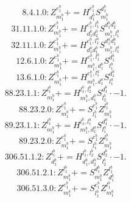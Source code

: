\documentclass[letterpaper,10pt,fleqn,leqno,onecolumn]{article}
\begin{document}
\begin{equation} \;\;\;\;\;\;  8.4.1.0: Z^{e_{1}^{b}}_{m_{1}^{b}}+=H^{e_{1}^{b}}_{d_{1}^{b}}S^{d_{1}^{b}}_{m_{1}^{b}} \end{equation}
\begin{equation} \;\;\;\;\;\;  31.11.1.0: Z^{e_{1}^{b}}_{m_{1}^{b}}+=H^{e_{1}^{b},l_{1}^{b}}_{d_{1}^{b}d_{2}^{b}}S^{d_{1}^{b}d_{2}^{b}}_{m_{1}^{b},l_{1}^{b}} \end{equation}
\begin{equation} \;\;\;\;\;\;  32.11.1.0: Z^{e_{1}^{b}}_{m_{1}^{b}}+=H^{e_{1}^{b},l_{1}^{a}}_{d_{1}^{a}d_{1}^{b}}S^{d_{1}^{a}d_{1}^{b}}_{m_{1}^{b},l_{1}^{a}} \end{equation}
\begin{equation} \;\;\;\;\;\;  12.6.1.0: Z^{e_{1}^{b}}_{m_{1}^{b}}+=H^{e_{1}^{b},l_{1}^{b}}_{m_{1}^{b},d_{1}^{b}}S^{d_{1}^{b}}_{l_{1}^{b}} \end{equation}
\begin{equation} \;\;\;\;\;\;  13.6.1.0: Z^{e_{1}^{b}}_{m_{1}^{b}}+=H^{e_{1}^{b},l_{1}^{a}}_{m_{1}^{b},d_{1}^{a}}S^{d_{1}^{a}}_{l_{1}^{a}} \end{equation}
\begin{equation} \;\;\;\;\;\;  88.23.1.1: Z^{l_{1}^{b}}_{m_{1}^{b}}+=H^{l_{1}^{b},l_{2}^{b}}_{m_{1}^{b},d_{1}^{b}}S^{d_{1}^{b}}_{l_{2}^{b}}\cdot -1. \end{equation}
\begin{equation} \;\;\;\;\;\;  88.23.2.0: Z^{e_{1}^{b}}_{m_{1}^{b}}+=S^{e_{1}^{b}}_{l_{1}^{b}}Z^{l_{1}^{b}}_{m_{1}^{b}} \end{equation}
\begin{equation} \;\;\;\;\;\;  89.23.1.1: Z^{l_{1}^{b}}_{m_{1}^{b}}+=H^{l_{1}^{b},l_{1}^{a}}_{m_{1}^{b},d_{1}^{a}}S^{d_{1}^{a}}_{l_{1}^{a}}\cdot -1. \end{equation}
\begin{equation} \;\;\;\;\;\;  89.23.2.0: Z^{e_{1}^{b}}_{m_{1}^{b}}+=S^{e_{1}^{b}}_{l_{1}^{b}}Z^{l_{1}^{b}}_{m_{1}^{b}} \end{equation}
\begin{equation} \;\;\;\;\;\;  306.51.1.2: Z^{l_{1}^{b}}_{d_{1}^{b}}+=H^{l_{1}^{b},l_{2}^{b}}_{d_{1}^{b},d_{2}^{b}}S^{d_{2}^{b}}_{l_{2}^{b}}\cdot -1. \end{equation}
\begin{equation} \;\;\;\;\;\;  306.51.2.1: Z^{l_{1}^{b}}_{m_{1}^{b}}+=S^{d_{1}^{b}}_{m_{1}^{b}}Z^{l_{1}^{b}}_{d_{1}^{b}} \end{equation}
\begin{equation} \;\;\;\;\;\;  306.51.3.0: Z^{e_{1}^{b}}_{m_{1}^{b}}+=S^{e_{1}^{b}}_{l_{1}^{b}}Z^{l_{1}^{b}}_{m_{1}^{b}} \end{equation}
\end{document}
